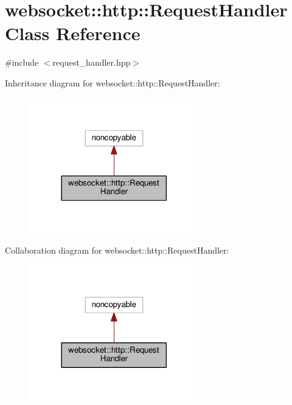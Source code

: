 \hypertarget{classwebsocket_1_1http_1_1RequestHandler}{}\section{websocket\+:\+:http\+:\+:Request\+Handler Class Reference}
\label{classwebsocket_1_1http_1_1RequestHandler}


{\ttfamily \#include $<$request\+\_\+handler.\+hpp$>$}



Inheritance diagram for websocket\+:\+:http\+:\+:Request\+Handler\+:
\nopagebreak
\begin{figure}[H]
\begin{center}
\leavevmode
\includegraphics[width=209pt]{classwebsocket_1_1http_1_1RequestHandler__inherit__graph}
\end{center}
\end{figure}


Collaboration diagram for websocket\+:\+:http\+:\+:Request\+Handler\+:
\nopagebreak
\begin{figure}[H]
\begin{center}
\leavevmode
\includegraphics[width=209pt]{classwebsocket_1_1http_1_1RequestHandler__coll__graph}
\end{center}
\end{figure}
